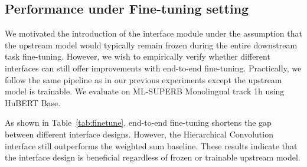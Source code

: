 \subsection{Performance under Fine-tuning setting}
We motivated the introduction of the interface module under the assumption that the upstream model would typically remain frozen during the entire downstream task fine-tuning.
However, we wish to empirically verify whether different interfaces can still offer improvements with end-to-end fine-tuning.
Practically, we follow the same pipeline as in our previous experiments except the upstream model is trainable.
We evaluate on ML-SUPERB Monolingual track 1h using HuBERT Base.




As shown in Table~\ref{tab:finetune}, end-to-end fine-tuning shortens the gap between different interface designs.
However, the Hierarchical Convolution interface still outperforms the weighted sum baseline.
These results indicate that the interface design is beneficial regardless of frozen or trainable upstream model.